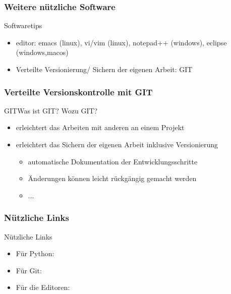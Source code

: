 \documentclass{beamer}
\begin{document}
\subsubsection{Weitere nützliche Software}
\begin{frame}{Softwaretips}

  \begin{itemize}
  \item
    editor: emacs (linux), vi/vim (linux), notepad++ (windows), eclipse (windows,macos)
  \item
    Verteilte Versionierung/ Sichern der eigenen Arbeit: GIT
  \end{itemize}
\end{frame}

\subsubsection{Verteilte Versionskontrolle mit GIT}

\begin{frame}{GIT}{Was ist GIT? Wozu GIT?}

  \begin{itemize}
  \item
    erleichtert das Arbeiten mit anderen an einem Projekt
  \item
    erleichtert das Sichern der eigenen Arbeit inklusive Versionierung
  \begin{itemize}
   \item automatische Dokumentation der Entwicklungsschritte
   \item Änderungen können leicht rückgängig gemacht werden
   \item ...
  \end{itemize}
  \end{itemize}
\end{frame}

\subsubsection{Nützliche Links}

\begin{frame}{Nützliche Links}{}

  \begin{itemize}
  \item
    Für Python:
  \item
    Für Git:
  \item
    Für die Editoren:
  \end{itemize}
\end{frame}
\end{document}
